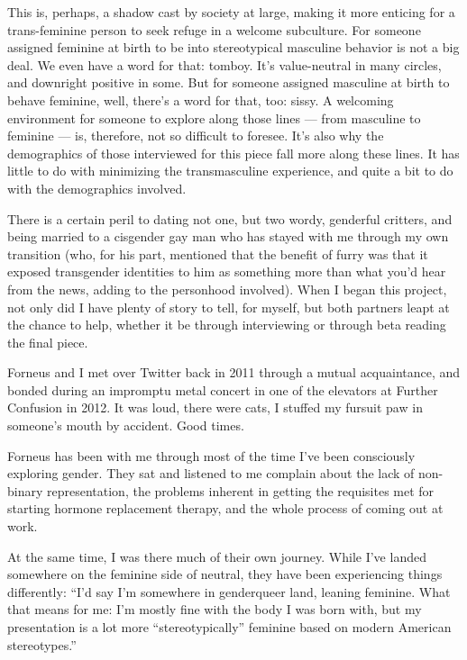 This is, perhaps, a shadow cast by society at large, making it more enticing for a trans-feminine person to seek refuge in a welcome subculture. For someone assigned feminine at birth to be into stereotypical masculine behavior is not a big deal. We even have a word for that: tomboy. It's value-neutral in many circles, and downright positive in some. But for someone assigned masculine at birth to behave feminine, well, there's a word for that, too: sissy. A welcoming environment for someone to explore along those lines --- from masculine to feminine --- is, therefore, not so difficult to foresee. It's also why the demographics of those interviewed for this piece fall more along these lines. It has little to do with minimizing the transmasculine experience, and quite a bit to do with the demographics involved.

\secdiv

There is a certain peril to dating not one, but two wordy, genderful critters, and being married to a cisgender gay man who has stayed with me through my own transition (who, for his part, mentioned that the benefit of furry was that it exposed transgender identities to him as something more than what you'd hear from the news, adding to the personhood involved). When I began this project, not only did I have plenty of story to tell, for myself, but both partners leapt at the chance to help, whether it be through interviewing or through beta reading the final piece.

Forneus and I met over Twitter back in 2011 through a mutual acquaintance, and bonded during an impromptu metal concert in one of the elevators at Further Confusion in 2012. It was loud, there were cats, I stuffed my fursuit paw in someone's mouth by accident. Good times.

Forneus has been with me through most of the time I've been consciously exploring gender. They sat and listened to me complain about the lack of non-binary representation, the problems inherent in getting the requisites met for starting hormone replacement therapy, and the whole process of coming out at work.

At the same time, I was there much of their own journey. While I've landed somewhere on the feminine side of neutral, they have been experiencing things differently: ``I'd say I'm somewhere in genderqueer land, leaning feminine. What that means for me: I'm mostly fine with the body I was born with, but my presentation is a lot more ``stereotypically'' feminine based on modern American stereotypes.''

